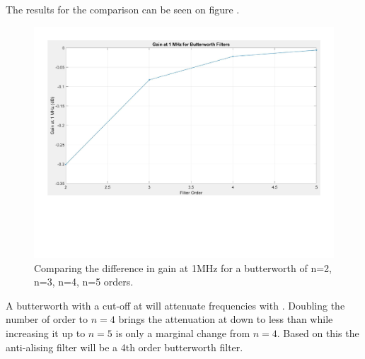 The results for the comparison can be seen on figure .

\begin{figure}[H]
    \centering
    \includegraphics[clip, trim=0 150 0 0, width=1\textwidth]{Appendix/Figures/A_FILT_BUT_COMP.pdf}
    \caption{Comparing the difference in gain at 1MHz for a butterworth of n=2, n=3, n=4, n=5 orders.}
    \label{fig:A_FILT_MAG_COMP}
\end{figure}

A butterworth with a cut-off at  will attenuate  frequencies with . Doubling the number of order to $n = 4$ brings the attenuation at  down to less than  while increasing it up to $n = 5$ is only a marginal change from $n = 4$. Based on this the anti-alising filter will be a 4th order butterworth filter.  